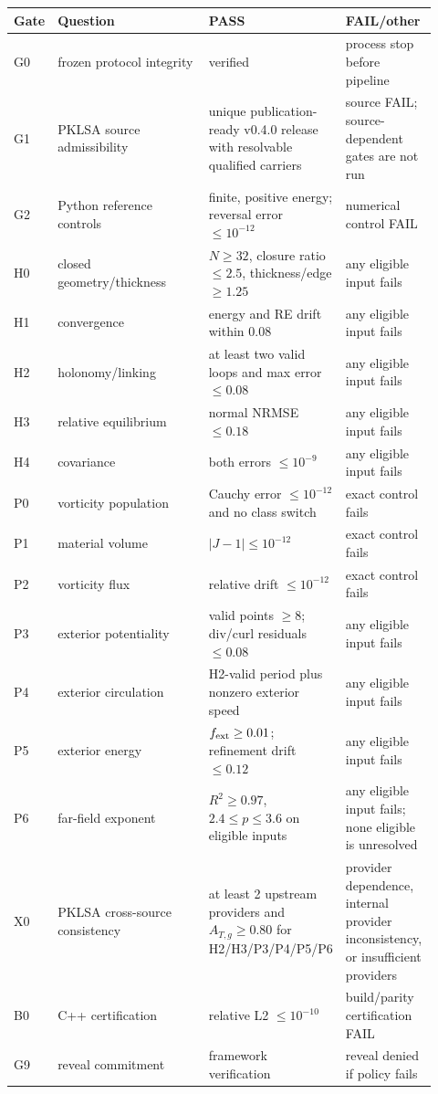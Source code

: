 \documentclass[11pt,a4paper]{article}
\begin{document}
\begin{longtable}{p{0.08\linewidth}p{0.42\linewidth}p{0.20\linewidth}p{0.22\linewidth}}
\toprule
Gate & Question & PASS & FAIL/other \\
\midrule
G0 & frozen protocol integrity & verified & process stop before pipeline \\
G1 & PKLSA source admissibility & unique publication-ready v0.4.0 release with resolvable qualified carriers & source FAIL; source-dependent gates are not run \\
G2 & Python reference controls & finite, positive energy; reversal error $\le10^{-12}$ & numerical control FAIL \\
H0 & closed geometry/thickness & $N\ge32$, closure ratio $\le2.5$, thickness/edge $\ge1.25$ & any eligible input fails \\
H1 & convergence & energy and RE drift within 0.08 & any eligible input fails \\
H2 & holonomy/linking & at least two valid loops and max error $\le0.08$ & any eligible input fails \\
H3 & relative equilibrium & normal NRMSE $\le0.18$ & any eligible input fails \\
H4 & covariance & both errors $\le10^{-9}$ & any eligible input fails \\
P0 & vorticity population & Cauchy error $\le10^{-12}$ and no class switch & exact control fails \\
P1 & material volume & $|J-1|\le10^{-12}$ & exact control fails \\
P2 & vorticity flux & relative drift $\le10^{-12}$ & exact control fails \\
P3 & exterior potentiality & valid points $\ge8$; div/curl residuals $\le0.08$ & any eligible input fails \\
P4 & exterior circulation & H2-valid period plus nonzero exterior speed & any eligible input fails \\
P5 & exterior energy & $f_{\rm ext}\ge0.01$; refinement drift $\le0.12$ & any eligible input fails \\
P6 & far-field exponent & $R^2\ge0.97$, $2.4\le p\le3.6$ on eligible inputs & any eligible input fails; none eligible is unresolved \\
X0 & PKLSA cross-source consistency & at least 2 upstream providers and $A_{T,g}\ge0.80$ for H2/H3/P3/P4/P5/P6 & provider dependence, internal provider inconsistency, or insufficient providers \\
B0 & C++ certification & relative L2 $\le10^{-10}$ & build/parity certification FAIL \\
G9 & reveal commitment & framework verification & reveal denied if policy fails \\
\bottomrule
\end{longtable}
\end{document}
